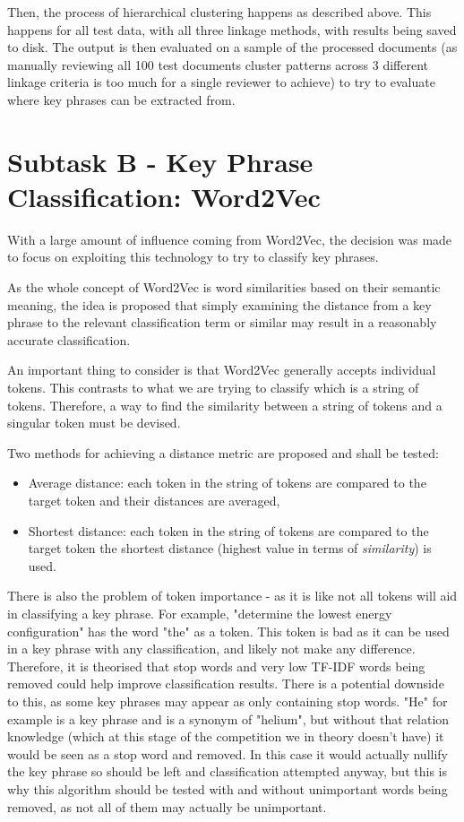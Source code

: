 Then, the process of hierarchical clustering happens as described above. This happens for all test data, with all three linkage methods, with results being saved to disk. The output is then evaluated on a sample of the processed documents (as manually reviewing all 100 test documents cluster patterns across 3 different linkage criteria is too much for a single reviewer to achieve) to try to evaluate where key phrases can be extracted from.

\section{Subtask B - Key Phrase Classification: Word2Vec}
With a large amount of influence coming from Word2Vec, the decision was made to focus on exploiting this technology to try to classify key phrases.

As the whole concept of Word2Vec is word similarities based on their semantic meaning, the idea is proposed that simply examining the distance from a key phrase to the relevant classification term or similar may result in a reasonably accurate classification. 

An important thing to consider is that Word2Vec generally accepts individual tokens. This contrasts to what we are trying to classify which is a string of tokens. Therefore, a way to find the similarity between a string of tokens and a singular token must be devised.

Two methods for achieving a distance metric are proposed and shall be tested:
\begin{itemize}
	\item Average distance: each token in the string of tokens are compared to the target token and their distances are averaged,
	\item Shortest distance: each token in the string of tokens are compared to the target token the shortest distance (highest value in terms of \textit{similarity}) is used.
\end{itemize}

There is also the problem of token importance - as it is like not all tokens will aid in classifying a key phrase. For example, "determine the lowest energy configuration" has the word "the" as a token. This token is bad as it can be used in a key phrase with any classification, and likely not make any difference. Therefore, it is theorised that stop words and very low TF-IDF words being removed could help improve classification results. There is a potential downside to this, as some key phrases may appear as only containing stop words. "He" for example is a key phrase and is a synonym of "helium", but without that relation knowledge (which at this stage of the competition we in theory doesn't have) it would be seen as a stop word and removed. In this case it would actually nullify the key phrase so should be left and classification attempted anyway, but this is why this algorithm should be tested with and without unimportant words being removed, as not all of them may actually be unimportant.

